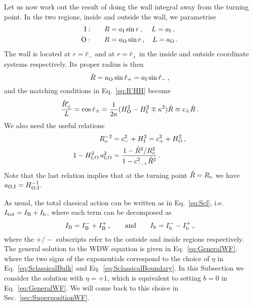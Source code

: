 \documentclass[11pt,a4paper]{article}
\begin{document}
Let us now work out the result of doing the wall integral away from
the turning point. In the two regions, inside and outside the wall, we parametrise
\begin{equation}
\begin{split}
\text{I}:& \qquad R = a_{\rm I} \sin r \,, \, \quad L = a_{\rm I} \,, \\
\text{O}:&\qquad R = a_{\rm O}\sin r \,, \quad L = a_{\rm O} \,.
\label{eq:a0aIR}
\end{split}
\end{equation}
The wall is located at $r = \hat{r}_{-}$ and at $r = \hat{r}_{+}$ in the inside and outside coordinate systems respectively. Its proper radius is then 
\begin{equation}
\hat{R} = a_{\rm O} \sin\hat{r}_{+} = a_{\rm I} \sin\hat{r}_{-} \,,\label{eq:Rhata0aI}
\end{equation}
 and the matching conditions in Eq.~\eqref{eq:R'HH} become 
\begin{equation}
\frac{\hat{R}'_{\pm}}{L} = \cos\hat{r}_{\pm} = \frac{1}{2 \kappa}(H_{\rm O}^{2} - H_{\rm I}^{2} \mp \kappa^{2}) \hat{R} \equiv c_{\pm} \hat{R} \,.\label{eq:Rhatprime}
\end{equation}
We also need the useful relations 
\begin{equation}
\label{eq:R0Rhat}
\begin{split}
R_{\rm o}^{-2} & = c_{-}^{2} + H_{\rm I}^{2} = c_{+}^{2} + H_{\rm O}^{2} \,,\\
1 - H_{\rm I,O}^{2} \, a_{\rm I,O}^{2} & = \frac{1 - \hat{R}^{2}/R_{\rm o}^{2}}{1 - c_{-,+}^{2} \hat R^{2}} \,.
\end{split}
\end{equation}
Note that the last relation implies that at the turning point $\hat{R}= R_{\rm o}$ we have $a_{\rm O,I} = H_{\rm O,I}^{-1}$.

As usual, the total classical action can be written as in Eq.~\eqref{eq:Scl}, i.e. $I_{\rm tot} = I_{\rm B} + I_{\rm b}$, where each term can be decomposed as
\begin{equation}
\label{eq:IDecomposition}
I_{\rm B} = I_{\rm B}^- + I_{\rm B}^+ \,, \qquad \text{and} \qquad I_{\rm b} = I_{\rm b}^- - I_{\rm b}^+ \,,
\end{equation}
where the $+/-$ subscripts refer to the outside and inside regions respectively. The general solution to the WDW equation is given in Eq.~\eqref{eq:GeneralWF}, where the two signs of the exponentials correspond to the choice of $\eta$ in Eq.~\eqref{eq:SclassicalBulk} and Eq.~\eqref{eq:SclassicalBoundary}. In this Subsection we consider the solution with $\eta = +1$, which is equivalent to setting $b = 0$ in Eq.~\eqref{eq:GeneralWF}. We will come back to this choice in Sec.~\ref{sec:SuperpositionWF}.
\end{document}
